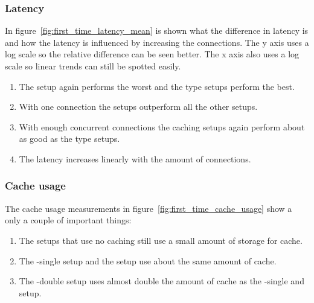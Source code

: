 \documentclass[twoside,openright]{uva-bachelor-thesis}
\begin{document}
\subsubsection{Latency}
In figure~\ref{fig:first_time_latency_mean} is shown what the difference in
latency is and how the latency is influenced by increasing the connections.
The y axis uses a log scale so the relative difference can be seen better. The x
axis also uses a log scale so linear trends can still be spotted easily.
\begin{enumerate}
    \item
        The \ipp setup again performs the worst and the \cdn type setups perform
        the best.

    \item
        With one connection the \cdn setups outperform all the other setups.

    \item
        With enough concurrent connections the caching \lt setups again perform
        about as good as the \cdn type setups.

    \item
        The latency increases linearly with the amount of connections.



\end{enumerate}



\subsubsection{Cache usage}
The cache usage measurements in figure~\ref{fig:first_time_cache_usage} show a
only a couple of important things:
\begin{enumerate}
    \item
        The setups that use no caching still use a small amount of storage for
        cache.

    \item
        The \lt-single setup and the \cdn setup use about the same amount of
        cache.

    \item
        The \lt-double setup uses almost double the amount of cache as the
        \lt-single and \cdn setup.
\end{enumerate}


\FloatBarrier
\end{document}
